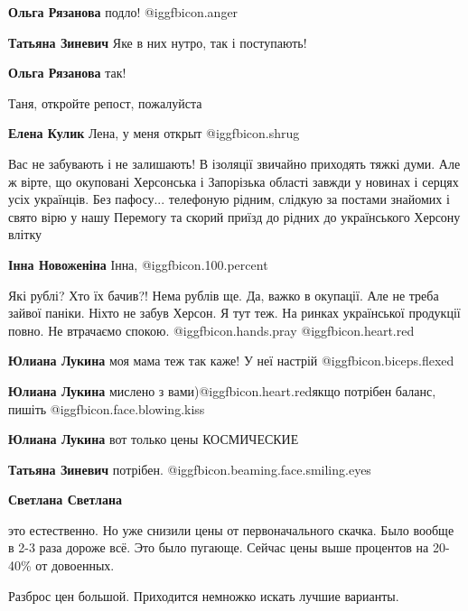 \begin{itemize}
\begin{itemize}
\textbf{Ольга Рязанова} подло! @igg{fbicon.anger} 

\textbf{Татьяна Зиневич} Яке в них нутро, так і поступають!

\textbf{Ольга Рязанова} так!

\end{itemize} %

Таня, откройте репост, пожалуйста

\textbf{Елена Кулик} Лена, у меня открыт @igg{fbicon.shrug}


Вас не забувають і не залишають! В ізоляції звичайно приходять тяжкі думи. Але
ж вірте, що окуповані Херсонська і Запорізька області завжди у новинах і серцях
усіх українців. Без пафосу... телефоную рідним, слідкую за постами знайомих і
свято вірю у нашу Перемогу та скорий приїзд до рідних до українського Херсону
влітку

\textbf{Інна Новоженіна} Інна, @igg{fbicon.100.percent} 


\obeycr
Які рублі? Хто їх бачив?!
Нема рублів ще.
Да, важко в окупації. Але не треба зайвої паніки.
Ніхто не забув Херсон.
Я тут теж.
На ринках української продукції повно.
Не втрачаємо спокою.  @igg{fbicon.hands.pray} @igg{fbicon.heart.red}
\restorecr

\begin{itemize} %
\textbf{Юлиана Лукина} моя мама теж так каже! У неї настрій @igg{fbicon.biceps.flexed} 

\textbf{Юлиана Лукина} мислено з вами)@igg{fbicon.heart.red}якщо потрібен баланс, пишіть @igg{fbicon.face.blowing.kiss} 

\textbf{Юлиана Лукина} вот только цены КОСМИЧЕСКИЕ

\textbf{Татьяна Зиневич} потрібен.  @igg{fbicon.beaming.face.smiling.eyes} 

\textbf{Светлана Светлана} 

это естественно. Но уже снизили цены от первоначального скачка. Было вообще в
2-3 раза дороже всё. Это было пугающе. Сейчас цены выше процентов на 20-40\% от
довоенных.

Разброс цен большой. Приходится немножко искать лучшие варианты.


\end{itemize}
\end{itemize}
